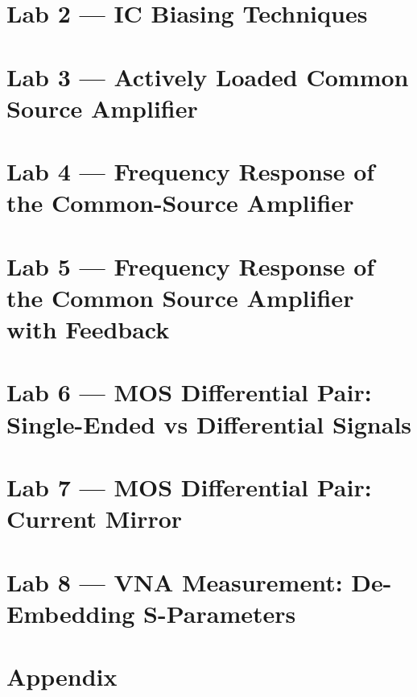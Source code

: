 \documentclass[12pt]{report}
\begin{document}
\chapter{Lab 2 — IC Biasing Techniques}

\chapter{Lab 3 — Actively Loaded Common Source Amplifier}

\chapter{Lab 4 — Frequency Response of the Common-Source Amplifier}

\chapter{Lab 5 — Frequency Response of the Common Source Amplifier with Feedback}

\chapter{Lab 6 — MOS Differential Pair: Single-Ended vs Differential Signals}

\chapter{Lab 7 — MOS Differential Pair: Current Mirror}

\chapter{Lab 8 — VNA Measurement: De-Embedding S-Parameters}



\newpage
\appendix
\chapter{Appendix}


\clearpage\singlespacing


\end{document}
